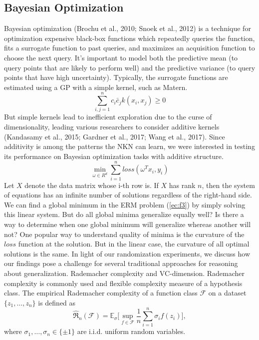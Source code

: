 \documentclass[9pt,a4paper,twoside]{tau}
\begin{document}
    \subsection{Bayesian Optimization}
       Bayesian optimization (Brochu et al., 2010; Snoek et al., 2012) is a technique for optimization expensive black-box functions which repeatedly queries the function, fits a surrogate function to past queries, and maximizes an acquisition function to choose the next query. It’s important to model both the predictive mean (to query points that are likely to perform well) and the predictive variance (to query points that have high uncertainty). Typically, the surrogate functions are estimated using a GP with a simple kernel, such as Matern.
       \begin{equation} \label{ec:f2}
			\sum_{i,j=1}^n c_i \bar c_j k(x_i,x_j) \ge 0
       \end{equation}
       But simple kernels lead to inefficient exploration due to the curse of dimensionality, leading various researchers to consider additive kernels (Kandasamy et al., 2015; Gardner et al., 2017; Wang et al., 2017). Since additivity is among the patterns the NKN can learn, we were interested in testing its performance on Bayesian optimization tasks with additive structure.
        \begin{equation} \label{ec:f3}
			\min_{\omega\in{R^d}}\sum _{i=1}^n loss(\omega^T x_i,y_i) 
		\end{equation}
   Let $X$ denote the data matrix whose i-th row is. If $X$ has rank $n$, then the system of equations has an infinite number of solutions regardless of the right-hand side. We can find a global minimum in the ERM problem (\ref{ec:f3}) by simply solving this linear system. But do all global minima generalize equally well? Is there a way to determine when one global minimum will generalize whereas another will not? One popular way to understand quality of minima is the curvature of the $loss$ function at the solution. But in the linear case, the curvature of all optimal solutions is the same.
In light of our randomization experiments, we discuss how our findings pose a challenge for several traditional approaches for reasoning about generalization. Rademacher complexity and VC-dimension. Rademacher complexity is commonly used and flexible complexity measure of a hypothesis class. The empirical Rademacher complexity of a function class $\mathcal{F}$ on a dataset ${\{z_1,…,z_n\}}$ is defined as
\begin{equation} \label{ec:f4}
			\hat\Re_n (\mathcal{F})=\mathds{E}_\sigma \Biggl[\sup_{f\in\mathcal{F}}\frac{1}{n}\sum_{i=1}^n \sigma_i f(z_i)\Biggr],
\end{equation}
where $\sigma_1, \dots, \sigma_n \in \{\pm1\}$ are i.i.d. uniform random variables.
\end{document}
